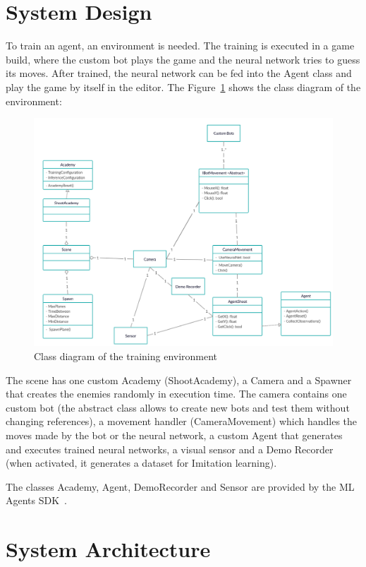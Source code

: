 \section{System Design}
\label{sec:system_design}

To train an agent, an environment is needed. The training is executed in a game build, where the custom bot plays the game and the neural network tries to guess its moves. After trained, the neural network can be fed into the Agent class and play the game by itself in the editor. The Figure~\ref{fig:classes} shows the class diagram of the environment:
\begin{figure}[b]
  \centering
		\includegraphics[width=.8\textwidth]{img/classDiagram.png}
  \caption{Class diagram of the training environment}
  \label{fig:classes}
\end{figure}

The scene has one custom Academy (ShootAcademy), a Camera and a Spawner that creates the enemies randomly in execution time. The camera contains one custom bot (the abstract class allows to create new bots and test them without changing references), a movement handler (CameraMovement) which handles the moves made by the bot or the neural network, a custom Agent that generates and executes trained neural networks, a visual sensor and a Demo Recorder (when activated, it generates a dataset for Imitation learning).

The classes Academy, Agent, DemoRecorder and Sensor are provided by the ML Agents SDK~\cite{mlagents}.

\section{System Architecture}

